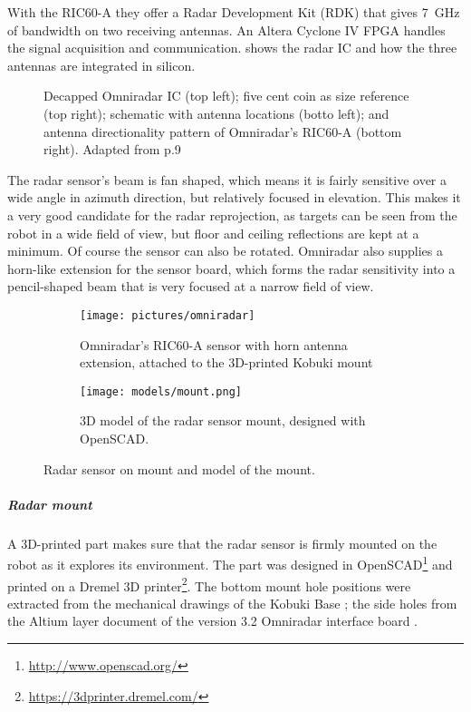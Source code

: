 With the RIC60-A they offer a Radar Development Kit (RDK) that gives
\SI{7}{GHz} of bandwidth on two receiving antennas. An Altera Cyclone IV FPGA
handles the signal acquisition and communication.  shows the
radar IC and how the three antennas are integrated in silicon.

\begin{figure}[htbp]
    \centering
    \def\svgwidth{12cm}
    
    \caption{Decapped Omniradar IC (top left); five cent coin as size reference (top right); schematic with antenna locations (botto left); and antenna directionality pattern of Omniradar's RIC60-A (bottom right). Adapted from \cite{Brouwer2015} p.9}
    \label{fig:slide_RIC60A}
\end{figure}

The radar sensor's beam is fan shaped, which means it is fairly
sensitive over a wide angle in azimuth direction, but relatively focused
in elevation. This makes it a very good candidate for the radar
reprojection, as targets can be seen from the robot in a wide field of
view, but floor and ceiling reflections are kept at a minimum. Of course
the sensor can also be rotated. Omniradar also supplies a horn-like
extension for the sensor board, which forms the radar sensitivity into a
pencil-shaped beam that is very focused at a narrow field of view.

\begin{figure}[htbp]
    \centering
    \begin{subfigure}[t]{0.51206961048\textwidth}
        \label{fig:omniradar}
        \texttt{[image: pictures/omniradar]}
        \caption{Omniradar's RIC60-A sensor with horn antenna extension, attached to the 3D-printed Kobuki mount}
    \end{subfigure}
    \hfill
    \begin{subfigure}[t]{0.43793038951\textwidth}
        \centering
        \label{fig:mount}
        \texttt{[image: models/mount.png]}
        \caption{3D model of the radar sensor mount, designed with OpenSCAD.}
    \end{subfigure}
    \caption{Radar sensor on mount and model of the mount.}
\end{figure}


\subparagraph{Radar mount}\label{radar-mount}

A 3D-printed part makes sure that the radar sensor is firmly mounted on
the robot as it explores its environment. The part was designed in
OpenSCAD\footnote{\url{http://www.openscad.org/}} and printed on a
Dremel 3D printer\footnote{\url{https://3dprinter.dremel.com/}}. The bottom
mount hole positions were extracted from the mechanical drawings of the
Kobuki Base \cite{YujinRobot2012}; the side holes from the Altium layer
document of the version 3.2 Omniradar interface board
\cite{Omniradar2014}.

